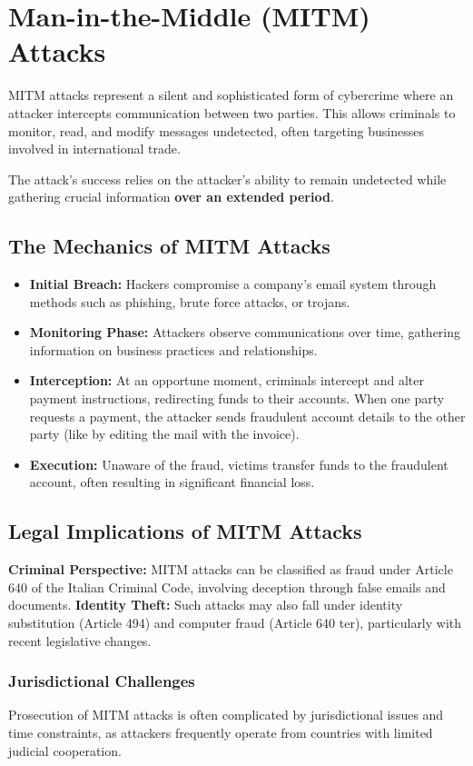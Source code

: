\section{Man-in-the-Middle (MITM) Attacks}
MITM attacks represent a silent and sophisticated form of cybercrime where an attacker intercepts communication between two parties. This allows criminals to monitor, read, and modify messages undetected, often targeting businesses involved in international trade. \bigskip

The attack's success relies on the attacker's ability to remain undetected while gathering crucial information \textbf{over an extended period}.

\subsection{The Mechanics of MITM Attacks}
\begin{itemize}[itemsep=0pt]
    \item \textbf{Initial Breach:} Hackers compromise a company's email system through methods such as phishing, brute force attacks, or trojans.
    \item \textbf{Monitoring Phase:} Attackers observe communications over time, gathering information on business practices and relationships.
    \item \textbf{Interception:} At an opportune moment, criminals intercept and alter payment instructions, redirecting funds to their accounts. When one party requests a payment, the attacker sends fraudulent account details to the other party (like by editing the mail with the invoice).
    \item \textbf{Execution:} Unaware of the fraud, victims transfer funds to the fraudulent account, often resulting in significant financial loss.
\end{itemize}

\subsection{Legal Implications of MITM Attacks}
\textbf{Criminal Perspective:} MITM attacks can be classified as fraud under Article 640 of the Italian Criminal Code, involving deception through false emails and documents. \textbf{Identity Theft:} Such attacks may also fall under identity substitution (Article 494) and computer fraud (Article 640 ter), particularly with recent legislative changes.

\subsubsection{Jurisdictional Challenges}
Prosecution of MITM attacks is often complicated by jurisdictional issues and time constraints, as attackers frequently operate from countries with limited judicial cooperation.

